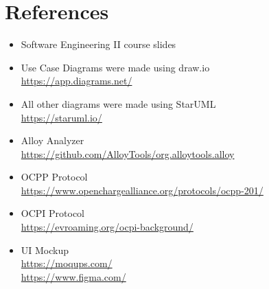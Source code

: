 \section{References}
\begin{itemize}
    \item Software Engineering II course slides
    \item Use Case Diagrams were made using draw.io\\ \url{https://app.diagrams.net/}
    \item All other diagrams were made using StarUML\\ \url{https://staruml.io/}
    \item Alloy Analyzer\\ \url{https://github.com/AlloyTools/org.alloytools.alloy}
    \item OCPP Protocol\\ \url{https://www.openchargealliance.org/protocols/ocpp-201/}
    \item OCPI Protocol\\ \url{https://evroaming.org/ocpi-background/}
    \item UI Mockup\\ \url{https://moqups.com/} \\ \url{https://www.figma.com/}
\end{itemize}